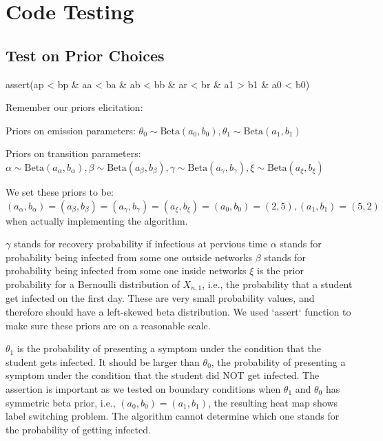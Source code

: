 \documentclass{article} %
\begin{document}
\section{Code Testing}

\subsection{Test on Prior Choices}

\begin{python}
assert(ap < bp & aa < ba & ab < bb & ar < br & a1 > b1 & a0 < b0)
\end{python}

Remember our priors elicitation:

Priors on emission parameters:
$\theta_0 \sim \text{Beta}(a_{0}, b_{0}), \theta_1 \sim \text{Beta}(a_{1}, b_{1})$

Priors on transition parameters:
$\alpha \sim \text{Beta}\left ( a_{\alpha},b_{\alpha} \right ), \beta \sim \text{Beta}\left (a_{\beta}, b_{\beta}\right ), \gamma\sim \text{Beta}\left (a_{\gamma}, b_{\gamma}\right ), \xi \sim \text{Beta}(a_{\xi}, b_{\xi})$

We set these priors to be:
$( a_{\alpha},b_{\alpha}) = (a_{\beta}, b_{\beta}) = (a_{\gamma}, b_{\gamma}) = (a_{\xi}, b_{\xi}) = (a_0, b_0) = (2, 5), (a_1, b_1) = (5,2)$ when actually implementing the algorithm.

$\gamma$ stands for recovery probability if infectious at pervious time
$\alpha$ stands for probability being infected from some one outside networks
$\beta$ stands for probability being infected from some one inside networks
$\xi$ is the prior probability for a Bernoulli distribution of $X_{n,1}$, i.e., the probability that a student get infected on the first day. These are very small probability values, and therefore should have a left-skewed beta distribution. We used `assert` function to make sure these priors are on a reasonable scale.

$\theta_1$ is the probability of presenting a symptom under the condition that the student gets infected. It should be larger than $\theta_0$, the probability of presenting a symptom under the condition that the student did NOT get infected. The assertion is important as we tested on boundary conditions when $\theta_1$ and $\theta_0$ has symmetric beta prior, i.e., $(a_0, b_0) = (a_1, b_1)$, the resulting heat map shows label switching problem. The algorithm cannot determine which one stands for the probability of getting infected.
\end{document}
